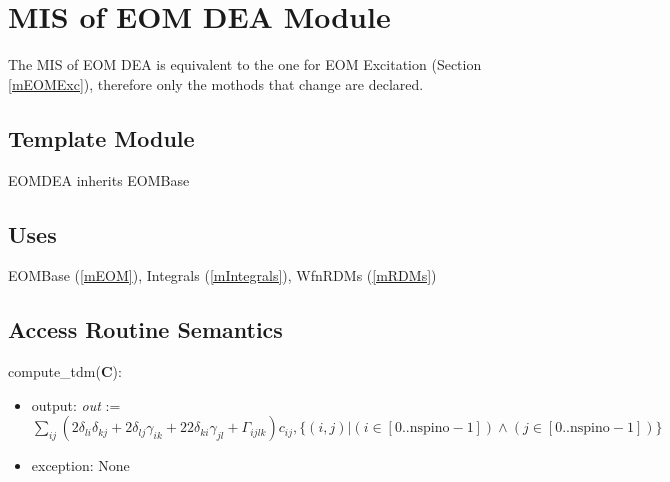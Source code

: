 \documentclass[12pt, titlepage]{article}
\begin{document}
\newpage

\section{MIS of EOM DEA Module} \label{mEOMDEA}
The MIS of EOM DEA is equivalent to the one for EOM Excitation (Section 
\ref{mEOMExc}), therefore only the mothods that change are declared.

\subsection{Template Module}

EOMDEA inherits EOMBase

\subsection{Uses}
EOMBase (\ref{mEOM}), Integrals (\ref{mIntegrals}), WfnRDMs (\ref{mRDMs})

\subsection{Access Routine Semantics}
\noindent compute\_tdm(\textbf{C}):
\begin{itemize}
	\item output: \textit{out} := \\
	$\sum_{ij}(2\delta_{li}\delta_{kj} + 2\delta_{lj}\gamma_{ik} + 2 
	2\delta_{ki}\gamma_{jl} + \Gamma_{ijlk})c_{ij}, \{(i,j)|(i\in 
	[0..\text{nspino}-1]) \land (j\in 
	[0..\text{nspino}-1])\}$
	\item exception: None
\end{itemize}
\end{document}
